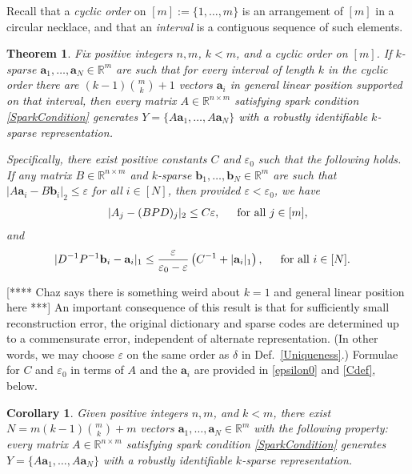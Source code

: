\documentclass[journal, onecolumn]{IEEEtran}
\newtheorem{theorem}{Theorem}
\newtheorem{corollary}{Corollary}
\begin{document}
Recall that a \textit{cyclic order} on $[m] := \{1, \ldots,m\}$ is an arrangement of $[m]$ in a circular necklace, and that an \textit{interval} is a contiguous sequence of such elements.  %

\begin{theorem}\label{DeterministicUniquenessTheorem}
Fix positive integers $n, m$, $k < m$, and a cyclic order on $[m]$. If $k$-sparse $\mathbf{a}_1, \ldots, \mathbf{a}_N \in \mathbb{R}^m$ are such that for every interval of length $k$ in the cyclic order there are $(k-1){m \choose k}+1$ vectors $\mathbf{a}_i$ in general linear position supported on that interval, then every matrix $A \in \mathbb{R}^{n \times m}$ satisfying spark condition \eqref{SparkCondition} generates $Y = \{A\mathbf{a}_1, \ldots, A\mathbf{a}_N\}$ with a robustly identifiable $k$-sparse representation.

Specifically, there exist positive constants $C$ and $\varepsilon_0$ such that the following holds. If any matrix $B \in \mathbb{R}^{n \times m}$ and $k$-sparse $\mathbf{b}_1, \ldots, \mathbf{b}_N \in \mathbb{R}^m$ are such that $|A\mathbf{a}_i - B\mathbf{b}_i|_2 \leq \varepsilon$ for all $i \in [N]$, then provided $\varepsilon < \varepsilon_0$, we have
\begin{align}\label{Cstable}
|A_j-(BPD)_j|_2 \leq C\varepsilon,\indent  \text{for all } j \in [m],
\end{align}
and 
\begin{align}\label{b-PDa}
|D^{-1}P^{-1}\mathbf{b}_i - \mathbf{a}_i|_1 &\leq \frac{\varepsilon }{\varepsilon_0 - \varepsilon} \left( C^{-1}+|\mathbf{a}_i|_1 \right),\indent  \text{for all } i \in [N].
\end{align}
\end{theorem}
[**** Chaz says there is something weird about $k=1$ and general linear position here ***]
An important consequence of this result is that for sufficiently small reconstruction error, the original dictionary and sparse codes are determined up to a commensurate error, independent of alternate representation.  (In other words, we may choose $\varepsilon$ on the same order as $\delta$ in Def.~\ref{Uniqueness}.) Formulae for  $C$ and $\varepsilon_0$ in terms of $A$ and the $\mathbf{a}_i$ are provided in \eqref{epsilon0} and \eqref{Cdef}, below. 

\begin{corollary}\label{DeterministicUniquenessCorollary}
Given positive integers $n, m$, and $k < m$, there exist $N =  m(k-1){m \choose k}+m$ vectors $\mathbf{a}_1, \ldots, \mathbf{a}_N \in \mathbb{R}^m$ with the following property: every matrix $A \in \mathbb{R}^{n \times m}$ satisfying spark condition \eqref{SparkCondition} generates $Y = \{A\mathbf{a}_1, \ldots, A\mathbf{a}_N\}$ with a robustly identifiable $k$-sparse representation.
\end{corollary}
\end{document}
